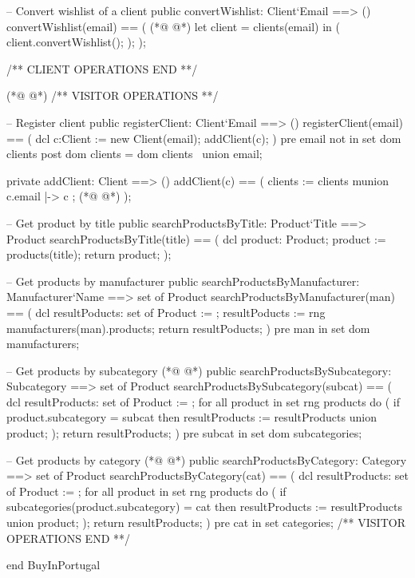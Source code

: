 \begin{vdmpp}[breaklines=true]
 -- Convert wishlist of a client
 public convertWishlist: Client`Email ==> ()
 convertWishlist(email) == (
(*@
\label{searchProductsByManufacturer:242}
@*)
  let client = clients(email)
  in (
   client.convertWishlist();
  );
 );
 
 /** CLIENT OPERATIONS END **/
 
 
(*@
\label{searchProductBySubcategory:251}
@*)
 /** VISITOR OPERATIONS **/
 
 -- Register client
 public registerClient: Client`Email ==> ()
 registerClient(email) == (
 dcl c:Client := new Client(email);
  addClient(c);
 )
 pre email not in set dom clients
 post dom clients = dom clients~ union {email};

 private addClient: Client ==> ()
 addClient(c) == (
  clients := clients munion { c.email |-> c };
(*@
\label{searchProductByCategory:265}
@*)
 );
 
 -- Get product by title
 public searchProductsByTitle: Product`Title ==> Product
 searchProductsByTitle(title) == (
  dcl product: Product;
  product := products(title);
  return product;
 );
 
  -- Get products by manufacturer
 public searchProductsByManufacturer: Manufacturer`Name ==> set of Product
 searchProductsByManufacturer(man) == (
  dcl resultPoducts: set of Product := {};
  resultPoducts := rng manufacturers(man).products;
  return resultPoducts;
 )
 pre man in set dom manufacturers;
 
 -- Get products by subcategory
(*@
\label{searchProductsBySubcategory:285}
@*)
 public searchProductsBySubcategory: Subcategory ==> set of Product
 searchProductsBySubcategory(subcat) == (
  dcl resultProducts: set of Product := {};
  for all product in set rng products
   do (
    if product.subcategory = subcat
    then resultProducts := resultProducts union {product};
   );
  return resultProducts;
 )
 pre subcat in set dom subcategories;
 
 
 -- Get products by category
(*@
\label{searchProductsByCategory:299}
@*)
 public searchProductsByCategory: Category ==> set of Product
 searchProductsByCategory(cat) == (
  dcl resultProducts: set of Product := {};
  for all product in set rng products
   do (
    if subcategories(product.subcategory) = cat
    then resultProducts := resultProducts union {product};
   );
  return resultProducts;
 )
 pre cat in set categories;
 /** VISITOR OPERATIONS END **/
 
end BuyInPortugal
\end{vdmpp}
\bigskip
